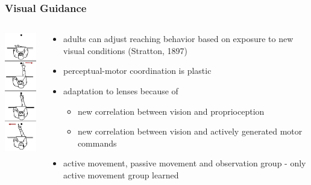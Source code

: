 \documentclass[]{beamer}
\begin{document}
\begin{frame}
 \frametitle{Visual Guidance}
\begin{overlayarea}{120mm}{90mm}

\begin{columns}[T]
 \begin{column}{20mm}
\begin{center}
\includegraphics[width=20mm]{figs/l9/phases_prism_adaptation_images.png}
\end{center}
 \end{column}
 \begin{column}{90mm}
 \begin{center}
    \begin{itemize}
   \item adults can adjust reaching behavior based on exposure to new visual conditions (Stratton, 1897) 
 \item<2-> perceptual-motor coordination is plastic
 \item<3-> adaptation to lenses because of
 \begin{itemize}
  \item new correlation between vision and proprioception
  \item new correlation between vision and actively generated motor commands
 \end{itemize}
 \item<4-> active movement, passive movement and observation group - only active movement group learned 
  \end{itemize}
\end{center} 
\end{column}
\end{columns}
\end{overlayarea}
\end{frame}
\end{document}
